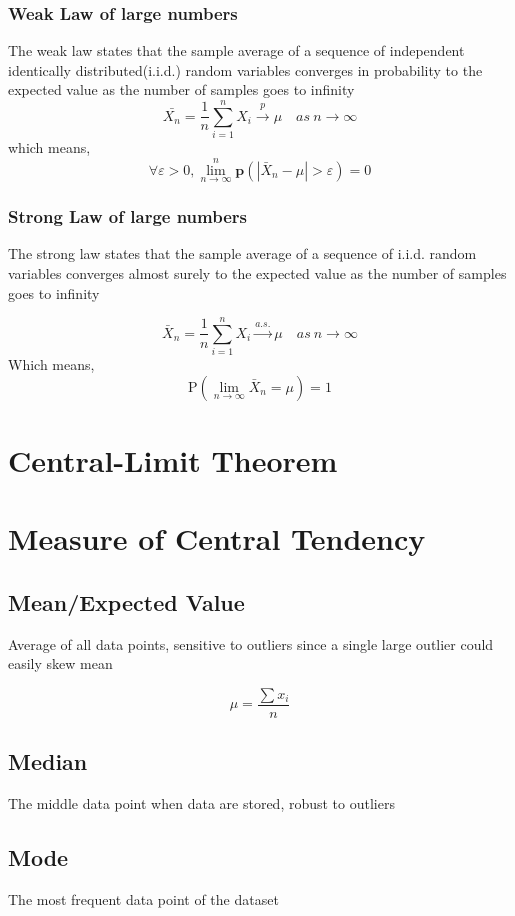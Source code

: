 \documentclass[12pt]{extarticle}
\begin{document}
\subsubsection{Weak Law of large numbers}
The weak law states that the sample average of a sequence of independent identically distributed(i.i.d.) random variables converges in probability to the expected value as the number of samples goes to infinity
$$\bar{X_n} = \frac{1}{n}\sum_{i=1}^{n}X_i \xrightarrow{p} \mu \quad as \ n \to \infty $$
which means, 
$$\forall \varepsilon>0, \lim_{n \to \infty}^n \mathbf{p}(|\bar{X}_n-\mu| > \varepsilon) = 0 $$
\subsubsection{Strong Law of large numbers}
The strong law states that the sample average of a sequence of i.i.d. random variables converges almost surely to the expected value as the number of samples goes to infinity 

$$\bar{X}_n = \frac{1}{n} \sum_{i=1}^n X_i \xrightarrow{a.s.} \mu \quad as\ n \to \infty$$
Which means, 
$$ \mathrm{P}(\lim_{n \to \infty} \bar{X}_n = \mu ) = 1 $$

\section{Central-Limit Theorem}


\section{Measure of Central Tendency} 

\subsection{Mean/Expected Value} 
Average of all data points, sensitive to outliers since a single large outlier could easily skew mean 

$$ \mu = \frac{\sum x_i}{n} $$ 

\subsection{Median}
The middle data point when data are stored, robust to outliers 

\subsection{Mode}
The most frequent data point of the dataset  
\end{document}

